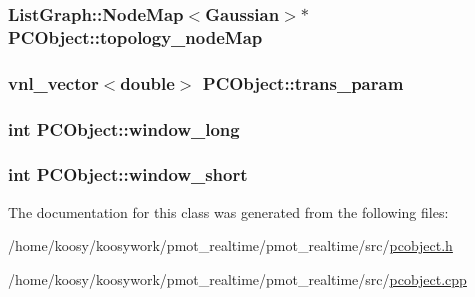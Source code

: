 \hypertarget{class_p_c_object_a99eafcc86b98ec0f1d165b8a96d351dc}{
\subsubsection[{topology\-\_\-node\-Map}]{\setlength{\rightskip}{0pt plus 5cm}\-List\-Graph\-::\-Node\-Map$<${\bf \-Gaussian}$>$$\ast$ {\bf \-P\-C\-Object\-::topology\-\_\-node\-Map}}}\label{class_p_c_object_a99eafcc86b98ec0f1d165b8a96d351dc}
\hypertarget{class_p_c_object_aca5e8c66727c01980551ac8744bfb26a}{
\subsubsection[{trans\-\_\-param}]{\setlength{\rightskip}{0pt plus 5cm}vnl\-\_\-vector$<$double$>$ {\bf \-P\-C\-Object\-::trans\-\_\-param}}}\label{class_p_c_object_aca5e8c66727c01980551ac8744bfb26a}
\hypertarget{class_p_c_object_a1606ff67b8422eac1ee46849bffdb69a}{
\subsubsection[{window\-\_\-long}]{\setlength{\rightskip}{0pt plus 5cm}int {\bf \-P\-C\-Object\-::window\-\_\-long}}}\label{class_p_c_object_a1606ff67b8422eac1ee46849bffdb69a}
\hypertarget{class_p_c_object_a6c90b358d6d19ab437841f829e448b7c}{
\subsubsection[{window\-\_\-short}]{\setlength{\rightskip}{0pt plus 5cm}int {\bf \-P\-C\-Object\-::window\-\_\-short}}}\label{class_p_c_object_a6c90b358d6d19ab437841f829e448b7c}


\-The documentation for this class was generated from the following files\-:\begin{DoxyCompactItemize}
\item 
/home/koosy/koosywork/pmot\-\_\-realtime/pmot\-\_\-realtime/src/\hyperlink{pcobject_8h}{pcobject.\-h}\item 
/home/koosy/koosywork/pmot\-\_\-realtime/pmot\-\_\-realtime/src/\hyperlink{pcobject_8cpp}{pcobject.\-cpp}\end{DoxyCompactItemize}
